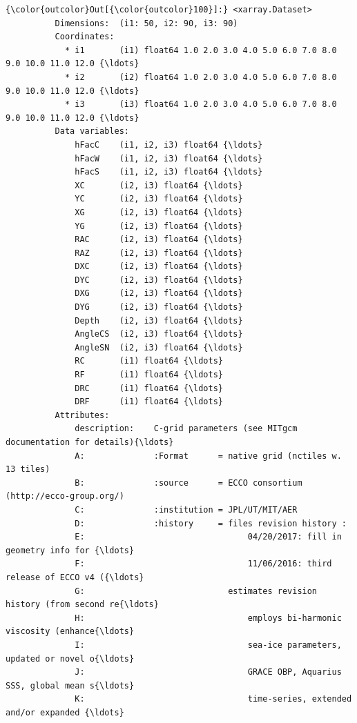 \documentclass[11pt]{article}
\begin{document}
\begin{Verbatim}[commandchars=\\\{\}]
{\color{outcolor}Out[{\color{outcolor}100}]:} <xarray.Dataset>
          Dimensions:  (i1: 50, i2: 90, i3: 90)
          Coordinates:
            * i1       (i1) float64 1.0 2.0 3.0 4.0 5.0 6.0 7.0 8.0 9.0 10.0 11.0 12.0 {\ldots}
            * i2       (i2) float64 1.0 2.0 3.0 4.0 5.0 6.0 7.0 8.0 9.0 10.0 11.0 12.0 {\ldots}
            * i3       (i3) float64 1.0 2.0 3.0 4.0 5.0 6.0 7.0 8.0 9.0 10.0 11.0 12.0 {\ldots}
          Data variables:
              hFacC    (i1, i2, i3) float64 {\ldots}
              hFacW    (i1, i2, i3) float64 {\ldots}
              hFacS    (i1, i2, i3) float64 {\ldots}
              XC       (i2, i3) float64 {\ldots}
              YC       (i2, i3) float64 {\ldots}
              XG       (i2, i3) float64 {\ldots}
              YG       (i2, i3) float64 {\ldots}
              RAC      (i2, i3) float64 {\ldots}
              RAZ      (i2, i3) float64 {\ldots}
              DXC      (i2, i3) float64 {\ldots}
              DYC      (i2, i3) float64 {\ldots}
              DXG      (i2, i3) float64 {\ldots}
              DYG      (i2, i3) float64 {\ldots}
              Depth    (i2, i3) float64 {\ldots}
              AngleCS  (i2, i3) float64 {\ldots}
              AngleSN  (i2, i3) float64 {\ldots}
              RC       (i1) float64 {\ldots}
              RF       (i1) float64 {\ldots}
              DRC      (i1) float64 {\ldots}
              DRF      (i1) float64 {\ldots}
          Attributes:
              description:    C-grid parameters (see MITgcm documentation for details){\ldots}
              A:              :Format      = native grid (nctiles w. 13 tiles)
              B:              :source      = ECCO consortium (http://ecco-group.org/)
              C:              :institution = JPL/UT/MIT/AER
              D:              :history     = files revision history :
              E:                                 04/20/2017: fill in geometry info for {\ldots}
              F:                                 11/06/2016: third release of ECCO v4 ({\ldots}
              G:                             estimates revision history (from second re{\ldots}
              H:                                 employs bi-harmonic viscosity (enhance{\ldots}
              I:                                 sea-ice parameters, updated or novel o{\ldots}
              J:                                 GRACE OBP, Aquarius SSS, global mean s{\ldots}
              K:                                 time-series, extended and/or expanded {\ldots}

\end{Verbatim}
\end{document}
